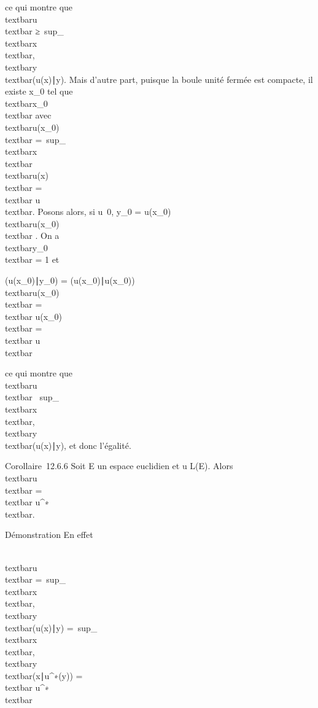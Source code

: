 \documentclass[]{article}
\begin{document}
ce qui montre que \\textbar{}u\\textbar{}
≥\
sup\_\\textbar{}x\\textbar{},\\textbar{}y\\textbar{}\textbar{}(u(x)∣y)\textbar{}.
Mais d'autre part, puisque la boule unité fermée est compacte, il existe
x\_0 tel que
\\textbar{}x\_0\\textbar{} 
avec \\textbar{}u(x\_0)\\textbar{}
=\
sup\_\\textbar{}x\\textbar{}\\textbar{}u(x)\\textbar{}
=\\textbar{} u\\textbar{}. Posons alors,
si u\neq~0, y\_0 = u(x\_0)
\over
\\textbar{}u(x\_0)\\textbar{} .
On a \\textbar{}y\_0\\textbar{} =
1 et

\textbar{}(u(x\_0)∣y\_0)\textbar{}
= (u(x\_0)∣u(x\_0))
\over
\\textbar{}u(x\_0)\\textbar{}
=\\textbar{} u(x\_0)\\textbar{}
=\\textbar{} u\\textbar{}

ce qui montre que \\textbar{}u\\textbar{}
\leq\
sup\_\\textbar{}x\\textbar{},\\textbar{}y\\textbar{}\textbar{}(u(x)∣y)\textbar{},
et donc l'égalité.

Corollaire~12.6.6 Soit E un espace euclidien et u \in L(E). Alors
\\textbar{}u\\textbar{}
=\\textbar{} u^∗\\textbar{}.

Démonstration En effet

\\textbar{}u\\textbar{}
=\
sup\_\\textbar{}x\\textbar{},\\textbar{}y\\textbar{}\textbar{}(u(x)∣y)\textbar{}
=\
sup\_\\textbar{}x\\textbar{},\\textbar{}y\\textbar{}\textbar{}(x∣u^∗(y))\textbar{}
=\\textbar{} u^∗\\textbar{}
\end{document}
